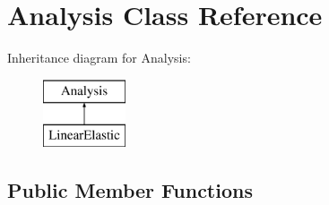 \hypertarget{class_analysis}{}\section{Analysis Class Reference}
\label{class_analysis}
Inheritance diagram for Analysis\+:\begin{figure}[H]
\begin{center}
\leavevmode
\includegraphics[height=2.000000cm]{class_analysis}
\end{center}
\end{figure}
\subsection*{Public Member Functions}
